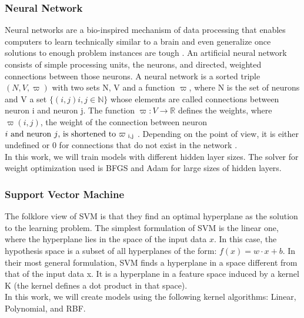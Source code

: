 \subsubsection{Neural Network}
\label{subsub:neural_network}
Neural networks are a bio-inspired mechanism of data processing that enables computers to learn technically similar to a brain and even generalize once solutions to enough problem instances are tough \cite{Kriesel2007NeuralNetworks}. An artificial neural network consists of simple processing units, the neurons, and directed, weighted connections between those neurons. A neural network is a sorted triple \((N, V, \varpi )\) with two sets N, V and a function \(\varpi\), where N is the set of neurons and V a set \(\{ (i, j) i, j \in \mathbb{N} \}\) whose elements are called connections between neuron i and neuron j. The function \( \varpi : V \rightarrow \mathbb{R}\) defines the weights, where \(\varpi(i, j)\), the weight of the connection between neuron \(i$ and neuron \(j$, is shortened to \(\varpi \textsubscript{ i,j}\) . Depending on the point of view, it is either undefined or 0 for connections that do not exist in the network \cite{Kriesel2007NeuralNetworks}. \\
In this work, we will train models with different hidden layer sizes. The solver for weight optimization used is BFGS\cite{Dai2013} and Adam\cite{adamNN} for large sizes of hidden layers.

\subsubsection{Support Vector Machine}
\label{subsub:svm}
The folklore view of SVM is that they find an optimal hyperplane as the solution to the learning problem. The simplest formulation of SVM is the linear one, where the hyperplane lies in the space of the input data \(x\). In this case, the hypothesis space is a subset of all hyperplanes of the form:
\(f(x) = w \cdotp x +b\).
In their most general formulation, SVM finds a hyperplane in a space different from that of the input data x. It is a hyperplane in a feature space induced by a kernel K (the kernel defines a dot product in that space)\cite{SVMEvgeniou}.\\
In this work, we will create models using the following kernel algorithms: Linear\cite{SVMTraining}, Polynomial\cite{SVMTraining}, and RBF\cite{SVMTraining}. 




